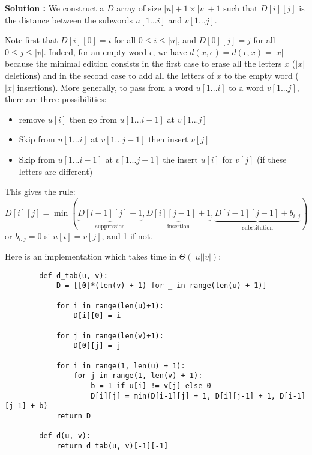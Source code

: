 \documentclass[11pt]{article} %
\newenvironment{solution}[1][\unskip]{%
	\par
	\noindent
	\textbf{Solution #1:}
	\noindent}
{\medskip}
\begin{document}
	\begin{solution}
		We construct a $ D $ array of size $ | u | + 1 \times | v | + 1 $ such that $ D [i] [j] $ is the distance between the subwords $ u [1 ... i] $ and $ v [1 ... j] $.

		Note first that $ D [i] [0] = i $ for all $ 0 \leq i \leq | u | $, and $ D [0] [j] = j $ for all $ 0 \leq j \leq | v | $. Indeed, for an empty word $ \epsilon $, we have $ d (x, \epsilon) = d (\epsilon, x) = | x | $ because the minimal edition consists in the first case to erase all the letters $ x $ ($ | x | $ deletions) and in the second case to add all the letters of $ x $ to the empty word ($ | x | $ insertions). More generally, to pass from a word $ u [1 ... i] $ to a word $ v [1 ... j] $, there are three possibilities:

		\begin{itemize}
			\item remove $u[i]$ then go from $u[1...i-1]$ at $v[1...j]$
			\item Skip from $u[1...i]$ at $v[1...j-1]$ then insert $v[j]$
			\item Skip from $u[1...i-1]$ at $v[1...j-1]$ the insert $u[i]$ for $v[j]$ (if these letters are different)
		\end{itemize}

		This gives the rule:
		$$D[i][j] = \min (\underbrace{D[i-1][j] + 1}_{\text{suppression}}, \underbrace{D[i][j-1]+1}_{\text{insertion}}, \underbrace{D[i-1][j-1] +b_{i,j}}_{\text{substitution}})$$
		or $b_{i,j}= 0$ si $u[i] = v[j]$, and 1 if not.
		
		\newpage
		Here is an implementation which takes time in $\Theta(|u||v|)$:
		\begin{lstlisting}
		def d_tab(u, v):
			D = [[0]*(len(v) + 1) for _ in range(len(u) + 1)]
			
			for i in range(len(u)+1):
				D[i][0] = i
			
			for j in range(len(v)+1):
				D[0][j] = j
			
			for i in range(1, len(u) + 1):
				for j in range(1, len(v) + 1):
					b = 1 if u[i] != v[j] else 0
					D[i][j] = min(D[i-1][j] + 1, D[i][j-1] + 1, D[i-1][j-1] + b)
			return D
			
		def d(u, v):
			return d_tab(u, v)[-1][-1]

		\end{lstlisting}
	\end{solution}
\end{document}
